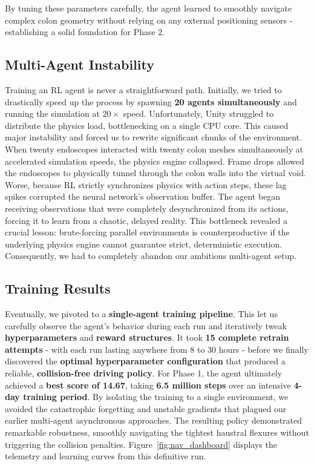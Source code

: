 By tuning these parameters carefully, the agent learned to smoothly navigate complex colon geometry without relying on any external positioning sensors - establishing a solid foundation for Phase 2.

\subsection{Multi-Agent Instability}
Training an RL agent is never a straightforward path. Initially, we tried to drastically speed up the process by spawning \textbf{20 agents simultaneously} and running the simulation at $20\times$ speed. Unfortunately, Unity struggled to distribute the physics load, bottlenecking on a single CPU core. This caused major instability and forced us to rewrite significant chunks of the environment. When twenty endoscopes interacted with twenty colon meshes simultaneously at accelerated simulation speeds, the physics engine collapsed. Frame drops allowed the endoscopes to physically tunnel through the colon walls into the virtual void. Worse, because RL strictly synchronizes physics with action steps, these lag spikes corrupted the neural network's observation buffer. The agent began receiving observations that were completely desynchronized from its actions, forcing it to learn from a chaotic, delayed reality. This bottleneck revealed a crucial lesson: brute-forcing parallel environments is counterproductive if the underlying physics engine cannot guarantee strict, deterministic execution. Consequently, we had to completely abandon our ambitious multi-agent setup.

\subsection{Training Results}
Eventually, we pivoted to a \textbf{single-agent training pipeline}. This let us carefully observe the agent's behavior during each run and iteratively tweak \textbf{hyperparameters} and \textbf{reward structures}. It took \textbf{15 complete retrain attempts} - with each run lasting anywhere from 8 to 30 hours - before we finally discovered the \textbf{optimal hyperparameter configuration} that produced a reliable, \textbf{collision-free driving policy}. For Phase 1, the agent ultimately achieved a \textbf{best score of 14.67}, taking \textbf{6.5 million steps} over an intensive \textbf{4-day training period}. By isolating the training to a single environment, we avoided the catastrophic forgetting and unstable gradients that plagued our earlier multi-agent asynchronous approaches. The resulting policy demonstrated remarkable robustness, smoothly navigating the tightest haustral flexures without triggering the collision penalties. Figure~\ref{fig:nav_dashboard} displays the telemetry and learning curves from this definitive run.

